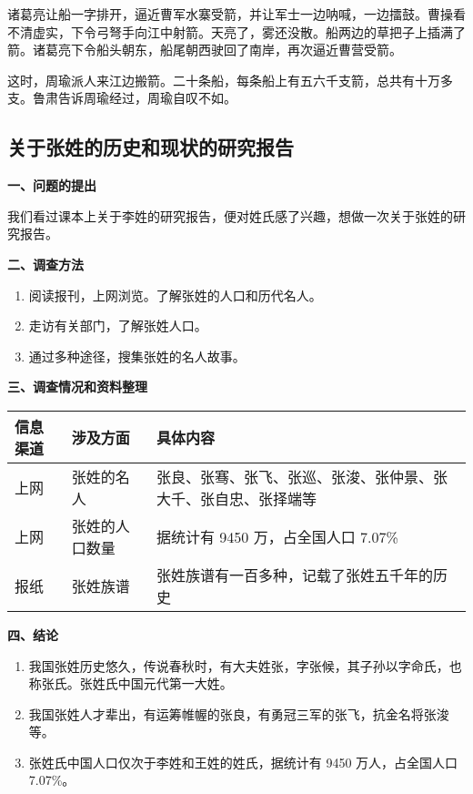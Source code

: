 \documentclass[UTF8,a4paper,titlepage,twoside,10.5pt]{article}
\begin{document}
诸葛亮让船一字排开，逼近曹军水寨受箭，并让军士一边呐喊，一边擂鼓。曹操看不清虚实，下令弓弩手向江中射箭。天亮了，雾还没散。船两边的草把子上插满了箭。诸葛亮下令船头朝东，船尾朝西驶回了南岸，再次逼近曹营受箭。

这时，周瑜派人来江边搬箭。二十条船，每条船上有五六千支箭，总共有十万多支。鲁肃告诉周瑜经过，周瑜自叹不如。

\subsection{关于张姓的历史和现状的研究报告}
\label{sec:orgd9336d7}

\textbf{一、问题的提出}

我们看过课本上关于李姓的研究报告，便对姓氏感了兴趣，想做一次关于张姓的研究报告。

\textbf{二、调查方法}

\begin{enumerate}
\item 阅读报刊，上网浏览。了解张姓的人口和历代名人。
\item 走访有关部门，了解张姓人口。
\item 通过多种途径，搜集张姓的名人故事。
\end{enumerate}

\textbf{三、调查情况和资料整理}

\begin{center}
\begin{tabular}{lll}
信息渠道 & 涉及方面 & 具体内容\\
\hline
上网 & 张姓的名人 & 张良、张骞、张飞、张巡、张浚、张仲景、张大千、张自忠、张择端等\\
上网 & 张姓的人口数量 & 据统计有 9450 万，占全国人口 7.07\%\\
报纸 & 张姓族谱 & 张姓族谱有一百多种，记载了张姓五千年的历史\\
\end{tabular}
\end{center}

\textbf{四、结论}

\begin{enumerate}
\item 我国张姓历史悠久，传说春秋时，有大夫姓张，字张候，其子孙以字命氏，也称张氏。张姓氏中国元代第一大姓。
\item 我国张姓人才辈出，有运筹帷幄的张良，有勇冠三军的张飞，抗金名将张浚等。
\item 张姓氏中国人口仅次于李姓和王姓的姓氏，据统计有 9450 万人，占全国人口 7.07\%。
\end{enumerate}
\end{document}
